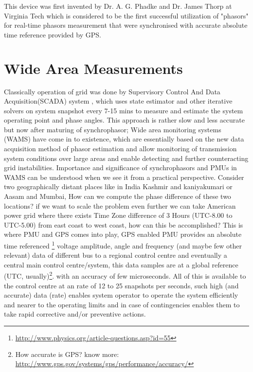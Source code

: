 This device was first invented by Dr. A. G. Phadke and Dr. James Thorp at Virginia Tech which is considered to be the first successful utilization of "phasors" for real-time phasors measurement that were synchronised with accurate absolute time reference provided by GPS.

\section{Wide Area Measurements}

Classically operation of grid was done by Supervisory Control And Data Acquisition(SCADA) system , which uses state estimator and other iterative solvers on system snapshot every 7-15 mins to measure and estimate the system operating point and phase angles. This approach is rather slow and less accurate but now after maturing of synchrophasor; Wide area monitoring systems (WAMS) have come in to existence, which are essentially based on the new data acquisition method of phasor estimation and allow monitoring of transmission system conditions over large areas and enable detecting and further counteracting grid instabilities. Importance and significance of synchrophasors and PMUs in WAMS can be understood when we see it from a practical perspective. Consider two geographically distant places like in India Kashmir and kaniyakumari or Aasam and Mumbai, How can we compute the phase difference of these two locations? if we want to scale the problem even further we can take American power grid where there exists Time Zone difference of 3 Hours (UTC-8.00 to UTC-5.00) from east coast to west coast, how can this be accomplished? This is where PMU and GPS comes into play, GPS enabled PMU provides an absolute time referenced \footnote{\url{http://www.physics.org/article-questions.asp?id=55}} voltage amplitude, angle and frequency (and maybe few other relevant) data of different bus to a regional control centre and eventually a central main control centre/system, this data samples are at a global reference (UTC, usually)\footnote{How accurate is GPS? know more: \url{http://www.gps.gov/systems/gps/performance/accuracy/}}. with an accuracy of few microseconds. All of this is available to the control centre at an rate of 12 to 25 snapshots per seconds, such high (and accurate) data (rate) enables system operator to operate the system efficiently and nearer to the operating limits and in case of contingencies enables them to take rapid corrective and/or preventive actions.
